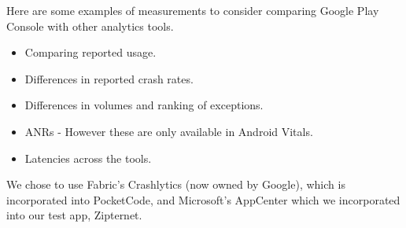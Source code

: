 Here are some examples of measurements to consider comparing Google Play Console with other analytics tools.
\begin{itemize}
    \item Comparing reported usage.
    \item Differences in reported crash rates.
    \item Differences in volumes and ranking of exceptions.
    \item ANRs - However these are only available in Android Vitals.
    \item Latencies across the tools.
\end{itemize}

We chose to use Fabric's Crashlytics (now owned by Google), which is incorporated into PocketCode, and Microsoft's AppCenter which we incorporated into our test app, Zipternet.
